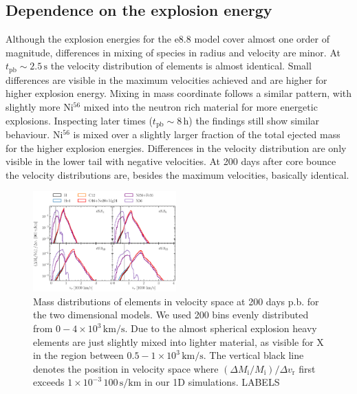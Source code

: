 \documentclass[fleqn,usenatbib]{mnras}
\newcommand{\nickel}{$\mathrm{Ni^{56}}$\xspace}
\newcommand{\tracer}{$\mathrm{X}$\xspace}
\newcommand{\COM}[1]{{\color{orange}#1}}
\begin{document}
\subsection{Dependence on the explosion energy}
\label{sec:Dependence on the explosion energy}
Although the explosion energies for the e8.8 model cover almost one order of magnitude, differences in mixing of species in radius and velocity are minor. At $t_{\mathrm{pb}}\sim 2.5 \,\text{s}$ the velocity distribution of elements is almost identical. Small differences are visible in the maximum velocities achieved and are higher for higher explosion energy. Mixing in mass coordinate follows a similar pattern, with slightly more \nickel mixed into the neutron rich material for more energetic explosions. 
Inspecting later times ($t_{\mathrm{pb}}\sim 8 \,\mathrm{h}$) the findings still show similar behaviour. \nickel is mixed over a slightly larger fraction of the total ejected mass for the higher explosion energies. Differences in the velocity distribution are only visible in the lower tail with negative velocities. 
At 200 days after core bounce the velocity distributions are, besides the maximum velocities, basically identical.
\begin{figure}
 \label{fig:e8_massDis_32d}
 \centering
 \includegraphics[width=0.49\textwidth]{pic/massDis_mvr_all_time_200d.pdf}
 \caption{Mass distributions of elements in velocity space at 200 days p.b. for the two dimensional models. We used 200 bins evenly distributed from  $0-4\times 10^3\,\mathrm{km/s}$. Due to the almost spherical explosion heavy elements are just slightly mixed into lighter material, as visible for \tracer in the region between $0.5-1\times 10^3\,\mathrm{km/s}$. The vertical black line denotes the position in velocity space where $(\Delta M_{\mathrm{i}}/M_{\mathrm{i}})/\Delta v_{\mathrm{r}}$ first exceeds $1\times 10^{-3}\,\mathrm{100\,s/km}$ in our 1D simulations. \COM{LABELS}}
\end{figure}
\end{document}
